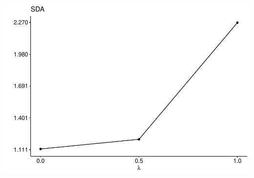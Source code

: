 \documentclass[
]{article}
\begin{document}
\includegraphics{sl-inf-cairs-2301_files/figure-latex/optResults-3.pdf}
\end{document}
